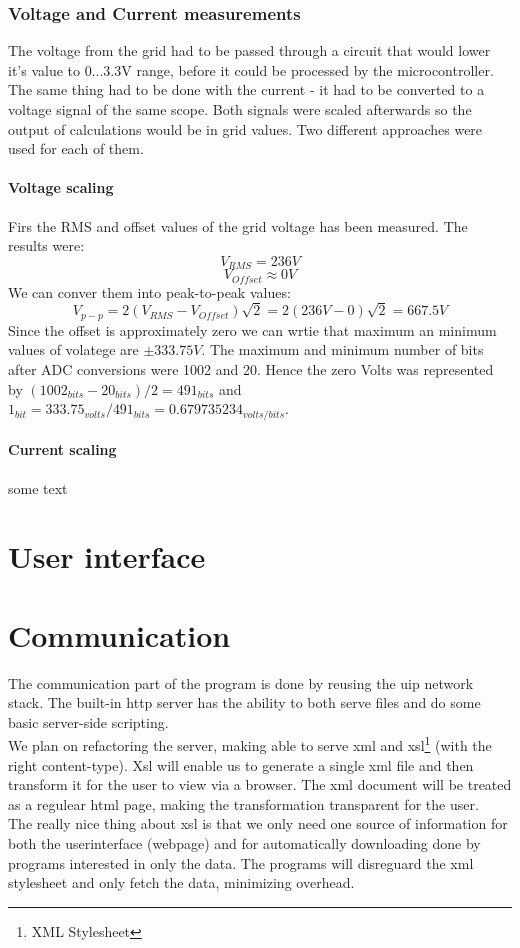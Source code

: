 \subsubsection{Voltage and Current measurements}
The voltage from the grid had to be passed through a circuit that would lower it's value to 0...3.3V range, before it could be processed by the microcontroller. The same thing had to be done with the current - it had to be converted to a voltage signal of the same scope. Both signals were scaled afterwards so the output of calculations would be in grid values. Two different approaches were used for each of them.

\paragraph{Voltage scaling}
Firs the RMS and offset values of the grid voltage has been measured. The results were: 
\[ V_{RMS}=236V \] 
\[ V_{Offset} \approx 0V\]
We can conver them into peak-to-peak values:
\[ V_{p-p}=2(V_{RMS}-V_{Offset})\sqrt{2}=2(236V-0)\sqrt{2}=667.5V \]
Since the offset is approximately zero we can wrtie that maximum an minimum values of volatege are $ \pm333.75V $. The maximum and minimum number of bits after ADC conversions were 1002 and 20. Hence the zero Volts was represented by $ (1002_{bits}-20_{bits})/2=491_{bits} $ and $ 1_{bit}=333.75_{volts}/491_{bits}=0.679735234_{volts/bits} $.

\paragraph{Current scaling}

some text


 
\section{User interface}
\section{Communication}
The communication part of the program is done by reusing the uip network stack. The built-in http server has the ability to both serve files and do some basic server-side scripting. \\
We plan on refactoring the server, making able to serve xml and xsl\footnote{XML Stylesheet} (with the right content-type). Xsl will enable us to generate a single xml file and then transform it for the user to view via a browser. The xml document will be treated as a regulear html page, making the transformation transparent for the user. \\
The really nice thing about xsl is that we only need one source of information for both the userinterface (webpage) and for automatically downloading done by programs interested in only the data. The programs will disreguard the xml stylesheet and only fetch the data, minimizing overhead.
